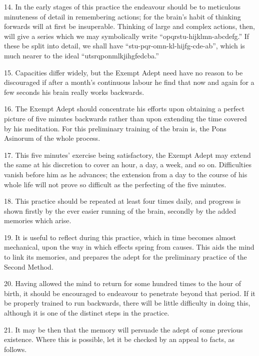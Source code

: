 \begin{sloppypar}
14. In the early stages of this practice the endeavour should be to meticulous minuteness of detail in remembering actions; for the brain's habit of thinking forwards will at first be insuperable. Thinking of large and complex actions, then, will give a series which we may symbolically write \mbox{\enquote{opqrstu-hijklmn-abcdefg.}} If these be split into detail, we shall have \mbox{\enquote{stu-pqr-o\textendash{}mn-kl-hij\textendash{}fg-cde-ab}}, which is much nearer to the ideal \mbox{\enquote{utsrqponmlkjihgfedcba.}}
\end{sloppypar}

15. Capacities differ widely, but the Exempt Adept need have no reason to be discouraged if after a month's continuous labour he find that now and again for a few seconds his brain really works backwards.

16. The Exempt Adept should concentrate his efforts upon obtaining a perfect picture of five minutes backwards rather than upon extending the time covered by his meditation. For this preliminary training of the brain is, the Pons Asinorum of the whole process.

17. This five minutes' exercise being satisfactory, the Exempt Adept may extend the same at his discretion to cover an hour, a day, a week, and so on. Difficulties vanish before him as he advances; the extension from a day to the course of his whole life will not prove so difficult as the perfecting of the five minutes.

18. This practice should be repeated at least four times  daily, and progress is shown firstly by the ever easier running of the brain, secondly by the added memories which arise.

19. It is useful to reflect during this practice, which in time becomes almost mechanical, upon the way in which effects spring from causes. This aids the mind to link its memories, and prepares the adept for the preliminary practice of the Second Method.

20. Having allowed the mind to return for some hundred times to the hour of birth, it should be encouraged to endeavour to penetrate beyond that period. If it be properly trained to run backwards, there will be little difficulty in doing this, although it is one of the distinct steps in the practice.

21. It may be then that the memory will persuade the adept of some previous existence. Where this is possible, let it be checked by an appeal to facts, as follows.

